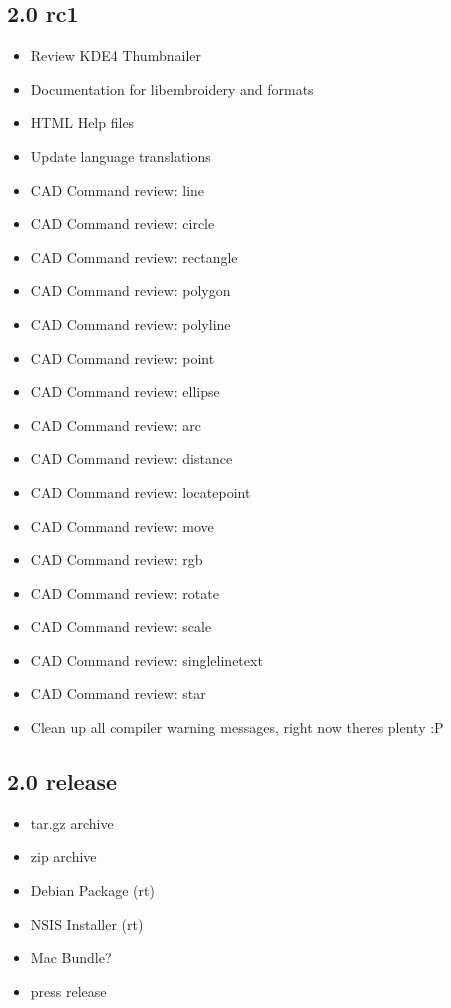 \documentclass[11pt]{report}
\begin{document}
\subsection{2.0 rc1}

\begin{itemize}
\item Review KDE4 Thumbnailer
\item Documentation for libembroidery and formats
\item HTML Help files
\item Update language translations
\item CAD Command review: line
\item CAD Command review: circle
\item CAD Command review: rectangle
\item CAD Command review: polygon
\item CAD Command review: polyline
\item CAD Command review: point
\item CAD Command review: ellipse
\item CAD Command review: arc
\item CAD Command review: distance
\item CAD Command review: locatepoint
\item CAD Command review: move
\item CAD Command review: rgb
\item CAD Command review: rotate
\item CAD Command review: scale
\item CAD Command review: singlelinetext
\item CAD Command review: star
\item Clean up all compiler warning messages, right now theres plenty :P
\end{itemize}

\subsection{2.0 release}

\begin{itemize}
\item tar.gz archive
\item zip archive
\item Debian Package (rt)
\item NSIS Installer (rt)
\item Mac Bundle?
\item press release
\end{itemize}
\end{document}
